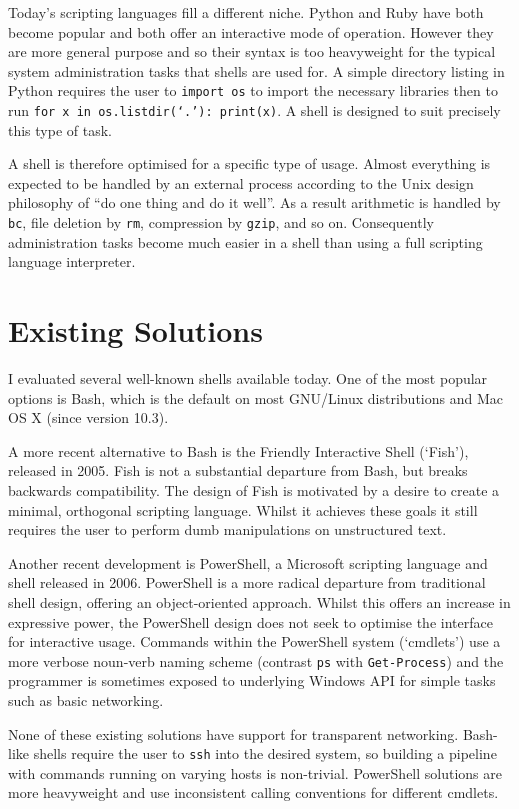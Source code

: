 \documentclass[12pt,twoside,notitlepage]{report}
\begin{document}
Today's scripting languages fill a different niche. Python and Ruby
have both become popular and both offer an interactive mode of
operation. However they are more general purpose and so their syntax
is too heavyweight for the typical system administration tasks that
shells are used for. A simple directory listing in Python requires the
user to {\tt import os} to import the necessary libraries then to run
{\tt for x in os.listdir(`.'): print(x)}. A shell is designed to suit
precisely this type of task.

A shell is therefore optimised for a specific type of usage. Almost
everything is expected to be handled by an external process according
to the Unix design philosophy of ``do one thing and do it well''. As a
result arithmetic is handled by {\tt bc}, file deletion by {\tt rm},
compression by {\tt gzip}, and so on. Consequently administration
tasks become much easier in a shell than using a full scripting
language interpreter.

\section{Existing Solutions}
I evaluated several well-known shells available today. One of the most popular
options is Bash, which is the default on most GNU/Linux distributions
and Mac OS X (since version 10.3).

A more recent alternative to Bash is the Friendly Interactive Shell
(`Fish'), released in 2005. Fish is not a substantial departure from
Bash, but breaks backwards compatibility. The design of Fish
\cite{fishdesign} is motivated by a desire to create a minimal,
orthogonal scripting language. Whilst it achieves these goals it still
requires the user to perform dumb manipulations on unstructured text.

Another recent development is PowerShell, a Microsoft scripting
language and shell released in 2006. PowerShell is a more radical
departure from traditional shell design, offering an object-oriented
approach. Whilst this offers an increase in expressive power, the
PowerShell design does not seek to optimise the interface for
interactive usage. Commands within the PowerShell system (`cmdlets')
use a more verbose noun-verb naming scheme (contrast {\tt ps} with
{\tt Get-Process}) and the programmer is sometimes exposed to
underlying Windows API for simple tasks such as basic networking.

None of these existing solutions have support for transparent
networking. Bash-like shells require the user to {\tt ssh} into the
desired system, so building a pipeline with commands running on
varying hosts is non-trivial. PowerShell solutions are more
heavyweight and use inconsistent calling conventions for different
cmdlets.
\end{document}
